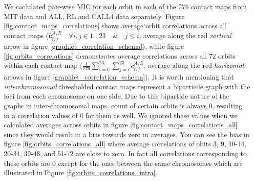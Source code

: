 \documentclass[a4,center,fleqn]{NAR}
\begin{document}
We caclulated pair-wise MIC for each orbit in each of the 276
contact maps from MIT data and ALL, RL and CALL4 data separately. 
Figure \ref{fig:contact_maps_correlations}
shows average orbit correlations across all contact maps
($\bar{\mathbf{c}}^{\scriptscriptstyle A,B}_{i,j} 
\quad \forall i,j \in {1 ... 23} \quad \& \quad j \le i$,
average along the red \textit{vertical} arrow in figure 
\ref{graphlet_correlation_schema}), while
figure \ref{fig:orbits_correlations} 
demonstrates average correlations across all 72 orbits within each  contact map
($\frac{1}{276}\sum_{i=0}^{23}\sum_{j=i}^{23}{
    c^{\scriptscriptstyle A,B}_{i,j}}$,
average along the red \textit{horizontal} arrows in figure 
\ref{graphlet_correlation_schema}).
It is worth mentioning that \textit{interchromosomal} thresholded contact maps 
represent
a biparticde graph with the loci from each chromosome on one side. Due to this
bipartide nature of the graphs in inter-chromosomal maps,
count of certain orbits is always 0, resulting in
a correlation values of 0 for them as well.
We ignored these values  when we calculated averages across orbits 
in figure \ref{fig:contact_maps_correlations_all} since they
would result in a bias towards zero in averages. You can see the bias in 
figure \ref{fig:orbits_correlations_all} where average correlations of obits
3, 9, 10-14, 20-34, 39-48, and 51-72 are close to zero. In fact all correlations
corresponding to these orbits are 0 except for the ones between the same 
chromosomes which are illustrated in Figure 
\ref{fig:orbits_correlations_intra}.
\end{document}
